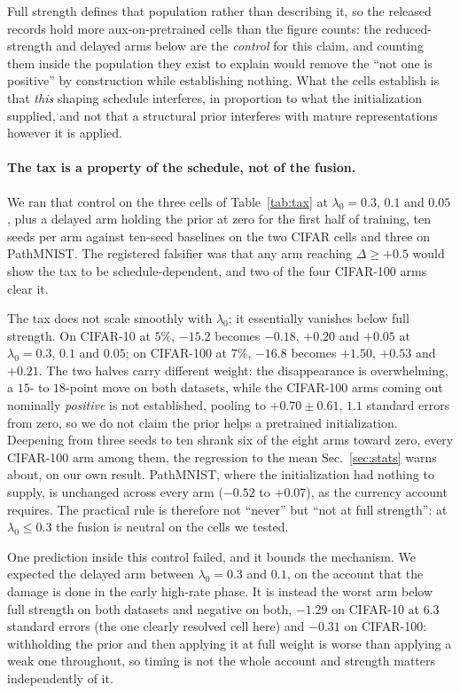 Full strength defines that population rather than describing it, so the
released records hold more aux-on-pretrained cells than the figure counts: the
reduced-strength and delayed arms below are the \emph{control} for this claim,
and counting them inside the population they exist to explain would remove the
``not one is positive'' by construction while establishing nothing. What the
\taxCells{} cells establish is that \emph{this} shaping schedule interferes, in
proportion to what the initialization supplied, and not that a structural prior
interferes with mature representations however it is applied.

\paragraph{The tax is a property of the schedule, not of the fusion.} We ran
that control on the three cells of Table~\ref{tab:tax} at $\lambda_0 = 0.3$,
$0.1$ and $0.05$, plus a delayed arm holding the prior at zero for the first
half of training, ten seeds per arm against ten-seed baselines on the two
CIFAR cells and three on PathMNIST. The
registered falsifier was that any arm reaching $\Delta \geq +0.5$ would show
the tax to be schedule-dependent, and two of the four CIFAR-100 arms clear it.

 The tax does not scale smoothly with $\lambda_0$; it essentially vanishes below
full strength. On CIFAR-10 at $5\%$, $-15.2$ becomes $-0.18$, $+0.20$ and
$+0.05$ at $\lambda_0 = 0.3$, $0.1$ and $0.05$; on CIFAR-100 at $7\%$, $-16.8$
becomes $+1.50$, $+0.53$ and $+0.21$. The two halves carry different weight:
the disappearance is overwhelming, a $15$- to $18$-point move on both datasets,
while the CIFAR-100 arms coming out nominally \emph{positive} is not
established, pooling to $+0.70 \pm 0.61$, $1.1$ standard errors from zero, so
we do not claim the prior helps a pretrained initialization. Deepening from three seeds to ten shrank six
of the eight arms toward zero, every CIFAR-100 arm among them, the regression
to the mean Sec.~\ref{sec:stats} warns about, on our own result. PathMNIST, where the initialization had
nothing to supply, is unchanged across every arm
($-0.52$ to $+0.07$), as the currency account requires. The practical rule is
therefore not ``never'' but ``not at full strength'': at $\lambda_0 \leq 0.3$
the fusion is neutral on the cells we tested.

One prediction inside this control failed, and it bounds the mechanism. We
expected the delayed arm between $\lambda_0 = 0.3$ and $0.1$, on the account
that the damage is done in the early high-rate phase. It is instead the worst
arm below full strength on both datasets and negative on both, $-1.29$ on
CIFAR-10 at $6.3$ standard errors (the one clearly resolved cell here) and
$-0.31$ on CIFAR-100: withholding the prior and then applying
it at full weight is worse than applying a weak one throughout, so timing is
not the whole account and strength matters independently of it.

